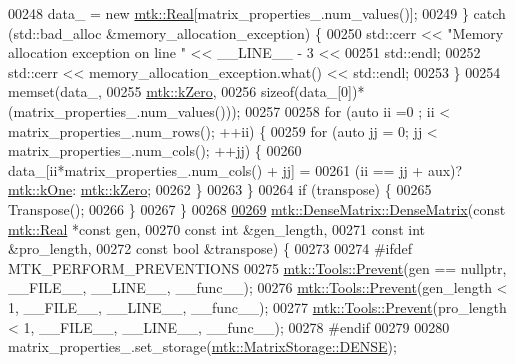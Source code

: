 \begin{DoxyCode}
00248     data\_ = \textcolor{keyword}{new} \hyperlink{group__c01-roots_gac080bbbf5cbb5502c9f00405f894857d}{mtk::Real}[matrix\_properties\_.num\_values()];
00249   \} \textcolor{keywordflow}{catch} (std::bad\_alloc &memory\_allocation\_exception) \{
00250     std::cerr << \textcolor{stringliteral}{"Memory allocation exception on line "} << \_\_LINE\_\_ - 3 <<
00251       std::endl;
00252     std::cerr << memory\_allocation\_exception.what() << std::endl;
00253   \}
00254   memset(data\_,
00255          \hyperlink{group__c01-roots_ga59a451a5fae30d59649bcda274fea271}{mtk::kZero},
00256          \textcolor{keyword}{sizeof}(data\_[0])*(matrix\_properties\_.num\_values()));
00257 
00258   \textcolor{keywordflow}{for} (\textcolor{keyword}{auto} ii =0 ; ii < matrix\_properties\_.num\_rows(); ++ii) \{
00259     \textcolor{keywordflow}{for} (\textcolor{keyword}{auto} jj = 0; jj < matrix\_properties\_.num\_cols(); ++jj) \{
00260       data\_[ii*matrix\_properties\_.num\_cols() + jj] =
00261         (ii == jj + aux)? \hyperlink{group__c01-roots_ga26407c24d43b6b95480943340d285c71}{mtk::kOne}: \hyperlink{group__c01-roots_ga59a451a5fae30d59649bcda274fea271}{mtk::kZero};
00262     \}
00263   \}
00264   \textcolor{keywordflow}{if} (transpose) \{
00265     Transpose();
00266   \}
00267 \}
00268 
\hypertarget{mtk__dense__matrix_8cc_source_l00269}{}\hyperlink{classmtk_1_1DenseMatrix_acedaf4058916614d66a18381e624a21d}{00269} \hyperlink{classmtk_1_1DenseMatrix_a0c75ee704707983f935b02835eab0933}{mtk::DenseMatrix::DenseMatrix}(\textcolor{keyword}{const} \hyperlink{group__c01-roots_gac080bbbf5cbb5502c9f00405f894857d}{mtk::Real} *\textcolor{keyword}{const} gen,
00270                               \textcolor{keyword}{const} \textcolor{keywordtype}{int} &gen\_length,
00271                               \textcolor{keyword}{const} \textcolor{keywordtype}{int} &pro\_length,
00272                               \textcolor{keyword}{const} \textcolor{keywordtype}{bool} &transpose) \{
00273 
00274 \textcolor{preprocessor}{  #ifdef MTK\_PERFORM\_PREVENTIONS}
00275   \hyperlink{classmtk_1_1Tools_a332324c6f25e66be9dff48c5987a3b9f}{mtk::Tools::Prevent}(gen == \textcolor{keyword}{nullptr}, \_\_FILE\_\_, \_\_LINE\_\_, \_\_func\_\_);
00276   \hyperlink{classmtk_1_1Tools_a332324c6f25e66be9dff48c5987a3b9f}{mtk::Tools::Prevent}(gen\_length < 1, \_\_FILE\_\_, \_\_LINE\_\_, \_\_func\_\_);
00277   \hyperlink{classmtk_1_1Tools_a332324c6f25e66be9dff48c5987a3b9f}{mtk::Tools::Prevent}(pro\_length < 1, \_\_FILE\_\_, \_\_LINE\_\_, \_\_func\_\_);
00278 \textcolor{preprocessor}{  #endif}
00279 
00280   matrix\_properties\_.set\_storage(\hyperlink{namespacemtk_ga25b67ec6a2afeee69f9bb196a9c66619a0706fbbd929bd8abc4de386c53d439ff}{mtk::MatrixStorage::DENSE});

\end{DoxyCode}
